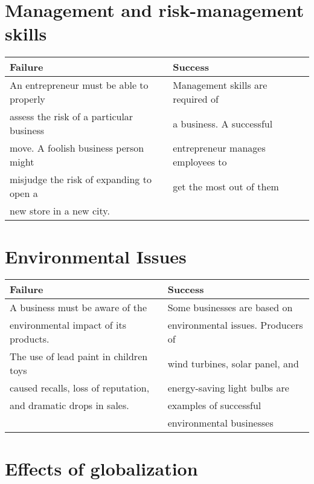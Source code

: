 \documentclass[11pt]{article}
\begin{document}
\section{Management and risk-management skills}
\label{sec:orgd24f7a8}

\begin{center}
\begin{tabular}{ll}
Failure & Success\\
\hline
An entrepreneur must be able to properly & Management skills are required of\\
assess the risk of a particular business & a business. A successful\\
move. A foolish business person might & entrepreneur manages employees to\\
misjudge the risk of expanding to open a & get the most out of them\\
new store in a new city. & \\
\end{tabular}
\end{center}

\section{Environmental Issues}
\label{sec:org9ac1270}

\begin{center}
\begin{tabular}{ll}
Failure & Success\\
\hline
A business must be aware of the & Some businesses are based on\\
environmental impact of its products. & environmental issues. Producers of\\
The use of lead paint in children toys & wind turbines, solar panel, and\\
caused recalls, loss of reputation, & energy-saving light bulbs are\\
and dramatic drops in sales. & examples of successful\\
 & environmental businesses\\
\end{tabular}
\end{center}

\section{Effects of globalization}
\label{sec:orga385e57}
\end{document}
